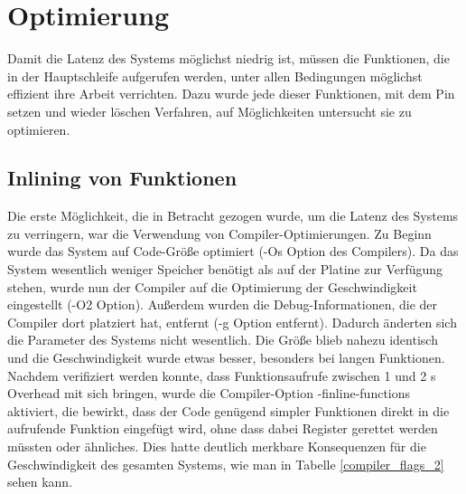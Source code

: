 \section{Optimierung}
Damit die Latenz des Systems möglichst niedrig ist, müssen die Funktionen, die in der Hauptschleife aufgerufen werden,
unter allen Bedingungen möglichst effizient ihre Arbeit verrichten. Dazu wurde jede dieser Funktionen, mit dem Pin setzen
und wieder löschen Verfahren, auf Möglichkeiten untersucht sie zu optimieren.
\subsection{Inlining von Funktionen}
Die erste Möglichkeit, die in Betracht gezogen wurde, um die Latenz des Systems zu verringern, war die Verwendung von
Compiler-Optimierungen. Zu Beginn wurde das System auf Code-Größe optimiert (-Os Option des Compilers). Da das System
wesentlich weniger Speicher benötigt als auf der Platine zur Verfügung stehen, wurde
nun der Compiler auf die Optimierung der Geschwindigkeit eingestellt (-O2 Option). Außerdem wurden die Debug-Informationen,
die der Compiler dort platziert hat, entfernt (-g Option entfernt). Dadurch änderten sich die Parameter des Systems nicht
wesentlich. Die Größe blieb nahezu identisch und die Geschwindigkeit wurde etwas besser, besonders bei langen Funktionen.\\
Nachdem verifiziert werden konnte, dass Funktionsaufrufe zwischen 1 und 2 \textmu{}s Overhead mit sich bringen, wurde
die Compiler-Option -finline-functions aktiviert, die bewirkt, dass der Code genügend simpler Funktionen direkt in die aufrufende
Funktion eingefügt wird, ohne dass dabei Register gerettet werden müssten oder ähnliches. Dies hatte deutlich merkbare
Konsequenzen für die Geschwindigkeit des gesamten Systems, wie man in Tabelle \ref{compiler_flags_2} sehen kann.
